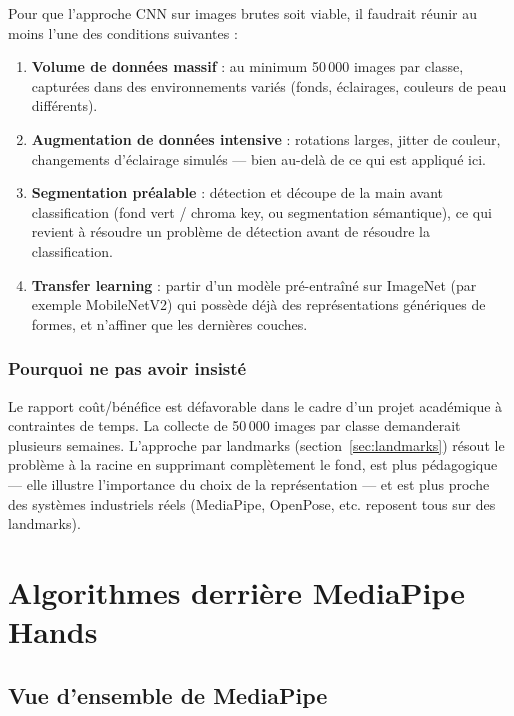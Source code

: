 \documentclass[12pt, a4paper]{article}
\begin{document}
Pour que l'approche CNN sur images brutes soit viable, il faudrait réunir au
moins l'une des conditions suivantes :

\begin{enumerate}
  \item \textbf{Volume de données massif} : au minimum 50\,000 images par classe,
        capturées dans des environnements variés (fonds, éclairages, couleurs de
        peau différents).
  \item \textbf{Augmentation de données intensive} : rotations larges, jitter de
        couleur, changements d'éclairage simulés --- bien au-delà de ce qui est
        appliqué ici.
  \item \textbf{Segmentation préalable} : détection et découpe de la main avant
        classification (fond vert / chroma key, ou segmentation sémantique), ce
        qui revient à résoudre un problème de détection avant de résoudre la
        classification.
  \item \textbf{Transfer learning} : partir d'un modèle pré-entraîné sur ImageNet
        (par exemple MobileNetV2) qui possède déjà des représentations génériques
        de formes, et n'affiner que les dernières couches.
\end{enumerate}

\subsubsection{Pourquoi ne pas avoir insisté}

Le rapport coût/bénéfice est défavorable dans le cadre d'un projet académique
à contraintes de temps. La collecte de 50\,000 images par classe demanderait
plusieurs semaines. L'approche par landmarks (section~\ref{sec:landmarks})
résout le problème à la racine en supprimant complètement le fond, est plus
pédagogique --- elle illustre l'importance du choix de la représentation ---
et est plus proche des systèmes industriels réels (MediaPipe, OpenPose, etc.
reposent tous sur des landmarks).

\section{Algorithmes derrière MediaPipe Hands}
\label{sec:mediapipe}

\subsection{Vue d'ensemble de MediaPipe}
\end{document}
